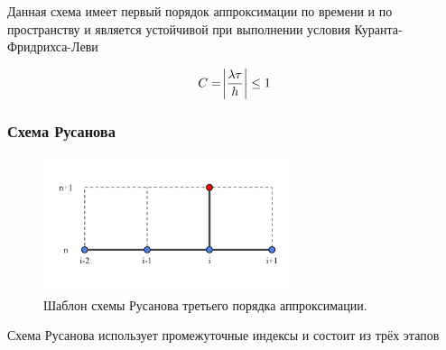 Данная схема имеет первый порядок аппроксимации по времени и по пространству и является устойчивой при выполнении условия Куранта-Фридрихса-Леви

\begin{equation}
    C = \abs{\dfrac{\lambda \tau}{h}} \leq 1 
    \label{eq:cfl_condition}
\end{equation}

\subsubsection{Схема Русанова}

\begin{figure}[H]
    \centering
    \includegraphics[trim={55pt 100pt 35pt 100pt},clip,height=4cm]{images/theory/scheme_rusanov.png}
    \caption{Шаблон схемы Русанова третьего порядка аппроксимации.}
    \label{fig:scheme_rusanov}
\end{figure}

Схема Русанова использует промежуточные индексы и состоит из трёх этапов \cite{kholodov} \cite{petrov_lobanov_book}

